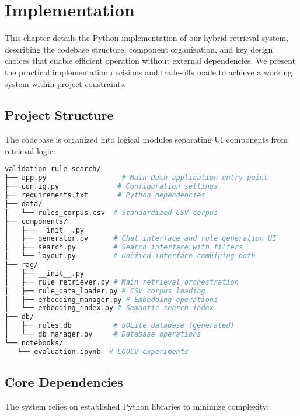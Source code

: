 \chapter{Implementation}
\label{ch:implementation}

This chapter details the Python implementation of our hybrid retrieval system, describing the codebase structure, component organization, and key design choices that enable efficient operation without external dependencies. We present the practical implementation decisions and trade-offs made to achieve a working system within project constraints.

\section{Project Structure}

The codebase is organized into logical modules separating UI components from retrieval logic:

\begin{lstlisting}[language=bash, caption={Project directory structure}, label={lst:project-structure}]
validation-rule-search/
├── app.py                  # Main Dash application entry point
├── config.py              # Configuration settings
├── requirements.txt       # Python dependencies
├── data/
│   └── rules_corpus.csv  # Standardized CSV corpus
├── components/
│   ├── __init__.py
│   ├── generator.py      # Chat interface and rule generation UI
│   ├── search.py         # Search interface with filters
│   └── layout.py         # Unified interface combining both
├── rag/
│   ├── __init__.py
│   ├── rule_retriever.py # Main retrieval orchestration
│   ├── rule_data_loader.py # CSV corpus loading
│   ├── embedding_manager.py # Embedding operations
│   └── embedding_index.py # Semantic search index
├── db/
│   ├── rules.db          # SQLite database (generated)
│   └── db_manager.py     # Database operations
└── notebooks/
   └── evaluation.ipynb  # LOOCV experiments
\end{lstlisting}

\section{Core Dependencies}

The system relies on established Python libraries to minimize complexity:

